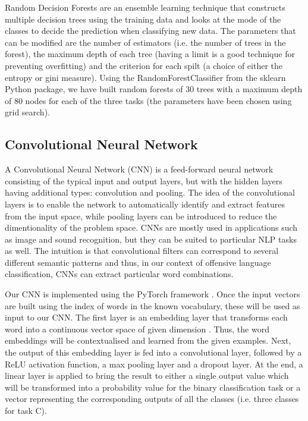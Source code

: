 \documentclass[11pt,a4paper]{article}
\begin{document}
Random Decision Forests \cite{RF} are an ensemble learning technique that constructs multiple decision trees using the training data and looks at the mode of the classes to decide the prediction when classifying new data. The parameters that can be modified are the number of estimators (i.e. the number of trees in the forest), the maximum depth of each tree (having a limit is a good technique for preventing overfitting) and the criterion for each spilt (a choice of either the entropy or gini measure). Using the RandomForestClassifier from the sklearn Python package, we have built random forests of 30 trees with a maximum depth of 80 nodes for each of the three tasks (the parameters have been chosen using grid search).


\subsection{Convolutional Neural Network}

A Convolutional Neural Network (CNN) \cite{CNN} is a feed-forward neural network consisting of the typical input and output layers, but with the hidden layers having additional types: convolution and pooling. The idea of the convolutional layers is to enable the network to automatically identify and extract features from the input space, while pooling layers can be introduced to reduce the dimentionality of the problem space. CNNs are mostly used in applications such as image and sound recognition, but they can be suited to particular NLP tasks as well. The intuition is that convolutional filters can correspond to several different semantic patterns \cite{Jacovi} and thus, in our context of offensive language classification, CNNs can extract particular word combinations.

Our CNN is implemented using the PyTorch framework \cite{pytorch}. Once the input vectors are built using the index of words in the known vocabulary, these will be used as input to our CNN. The first layer is an embedding layer that transforms each word into a continuous vector space of given dimension \cite{Mikolov}. Thus, the word embeddings will be contextualised and learned from the given examples. Next, the output of this embedding layer is fed into a convolutional layer, followed by a ReLU activation function, a max pooling layer and a dropout layer. At the end, a linear layer is applied to bring the result to either a single output value which will be transformed into a probability value for the binary classification task or a vector representing the corresponding outputs of all the classes (i.e. three classes for task C).
\end{document}
